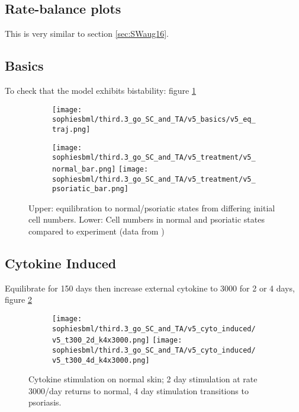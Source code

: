 \documentclass[a4paper,10pt]{report}
\newcommand{\psortbase}{/home/ngrs2/work/bsu/PSORT_Zuliani_Reynolds/}
\newcommand{\sbmlbase}{\psortbase/sbml-sh/}
\newcommand{\sophiesbml}{\sbmlbase/sophie_like}
\begin{document}
\subsection{Rate-balance plots}

This is very similar to section \ref{sec:SWaug16}. 

\subsection{Basics}
To check that the model exhibits bistability: figure \ref{fig:thirdpoint3sophie_basics}

\begin{figure}[h!]
    \centering
    \begin{subfigure}{\textwidth}
    \texttt{[image: \\sophiesbml/third.3\_go\_SC\_and\_TA/v5\_basics/v5\_eq\_traj.png]}
    \end{subfigure}
    \begin{subfigure}{\textwidth}
    \texttt{[image: \\sophiesbml/third.3\_go\_SC\_and\_TA/v5\_treatment/v5\_normal\_bar.png]}
    \texttt{[image: \\sophiesbml/third.3\_go\_SC\_and\_TA/v5\_treatment/v5\_psoriatic\_bar.png]}
    \end{subfigure}

  \caption{Upper: equilibration to normal/psoriatic states from differing initial cell numbers. Lower: Cell numbers in normal and psoriatic states compared to experiment (data from \cite{zhang2015modelling})}
  \label{fig:thirdpoint3sophie_basics}
\end{figure}




\subsection{Cytokine Induced}

Equilibrate for 150 days then increase external cytokine to 3000 for 2 or 4 days, figure \ref{fig:thirdpoint3sophie_cytostim}


\begin{figure}[h!]
  \begin{subfigure}{\textwidth}
    \texttt{[image: \\sophiesbml/third.3\_go\_SC\_and\_TA/v5\_cyto\_induced/v5\_t300\_2d\_k4x3000.png]}
    \texttt{[image: \\sophiesbml/third.3\_go\_SC\_and\_TA/v5\_cyto\_induced/v5\_t300\_4d\_k4x3000.png]}
  \end{subfigure}
  \caption{Cytokine stimulation on normal skin; 2 day stimulation at rate 3000/day returns to normal, 4 day stimulation transitions to psoriasis.}
  \label{fig:thirdpoint3sophie_cytostim}
\end{figure}
\end{document}

